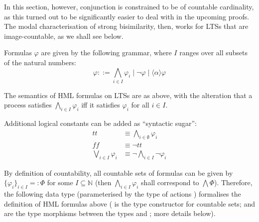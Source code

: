 \begin{isabellebody}
\begin{isamarkuptext}
In this section, however, conjunction is constrained to be of countable cardinality, as this turned out to be significantly easier to deal with in the upcoming proofs. The modal characterisation of strong bisimilarity, then, works for LTSs that are image-countable, as we shall see below.

Formulas $\varphi$ are given by the following grammar, where $I$ ranges over all subsets of the natural numbers:
$$\varphi ::= \bigwedge_{i \in I} \varphi_i \mid \neg\varphi \mid \langle\alpha\rangle\varphi$$

The semantics of HML formulas on LTSs are as above, with the alteration that a process satisfies $\bigwedge_{i \in I} \varphi_i$ iff it satisfies $\varphi_i$ for all $i \in I$.

Additional logical constants can be added as \enquote{syntactic sugar}:
\begin{align*}
    t\!t &\equiv \textstyle\bigwedge_{i \in \emptyset} \varphi_i \\
    f\!\!f &\equiv \neg t\!t \\
    \bigvee_{i \in I} \varphi_i &\equiv \neg \bigwedge_{i \in I} \neg\varphi_i
\end{align*}%
\end{isamarkuptext}\isamarkuptrue%
%
\isadelimdocument
%
\endisadelimdocument
%
\isatagdocument
%
\isamarkuptrue%
%
\isamarkuptrue%
%
\endisatagdocument
{\isafolddocument}%
%
\isadelimdocument
%
\endisadelimdocument
%
\begin{isamarkuptext}%
By definition of countability, all countable sets of formulas can be given by $\{\varphi_i\}_{i \in I} =: \Phi$ for some $I \subseteq \mathbb{N}$ (then $\bigwedge_{i \in I} \varphi_i$ shall correspond to $\bigwedge \Phi$). Therefore, the following data type (parameterised by the type of actions ) formalises the definition of HML formulas above ( is the type constructor for countable sets;  and  are the type morphisms between the types  and ; more details below).


\end{isamarkuptext}
\end{isabellebody}
